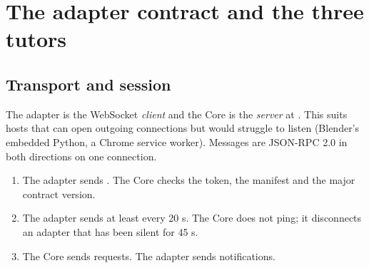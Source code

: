 ﻿\section{The adapter contract and the three tutors}\label{sec:adapters}

\subsection{Transport and session}

The adapter is the WebSocket \emph{client} and the Core is the \emph{server} at . This suits hosts that can open outgoing connections but would struggle to listen (Blender's embedded Python, a Chrome service worker). Messages are JSON-RPC 2.0 in both directions on one connection.

\begin{enumerate}[leftmargin=1.4em]
  \item The adapter sends . The Core checks the token, the manifest and the major contract version.
  \item The adapter sends  at least every 20 s. The Core does not ping; it disconnects an adapter that has been silent for 45 s.
  \item The Core sends  requests. The adapter sends  notifications.
\end{enumerate}

